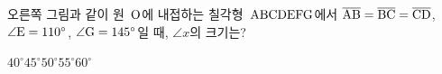 \noindent\begin{minipage}[t]{0.58\linewidth}\vspace{0pt}\raggedright 오른쪽 그림과 같이 원~$\mathrm{O}$에 내접하는 칠각형~$\mathrm{ABCDEFG}$에서 $\overline{\mathrm{AB}}=\overline{\mathrm{BC}}=\overline{\mathrm{CD}}$, $\angle\mathrm{E}=110^\circ$, $\angle\mathrm{G}=145^\circ$일 때, $\angle x$의 크기는?\end{minipage}\hfill\begin{minipage}[t]{0.4\linewidth}\vspace{0pt}\centering \resizebox{\ifdim\width>\linewidth\linewidth\else\width\fi}{!}{}\end{minipage}\par
\begin{choicesii}{$40^\circ$}{$45^\circ$}{$50^\circ$}{$55^\circ$}{$60^\circ$}\end{choicesii}

